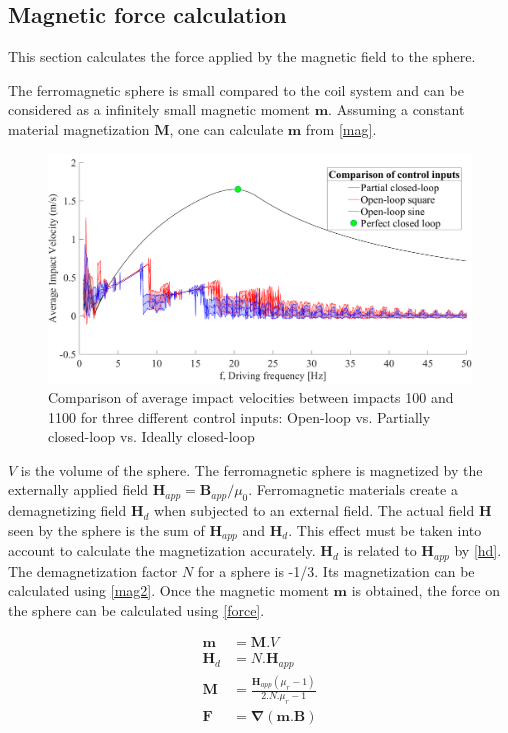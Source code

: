 \documentclass[letterpaper, 10 pt, conference]{ieeeconf}  %
\begin{document}
\subsection{Magnetic force calculation}
\label{magforce}

This section calculates the force applied by the magnetic field to the sphere.\par
The ferromagnetic sphere is small compared to the coil system and can be considered as a infinitely small magnetic moment $\mathbf{m}$. Assuming a constant material magnetization $\mathbf{M}$, one can calculate $\mathbf{m}$ from \cref{mag}.

\begin{figure}
	\includegraphics[width=\linewidth]{ComparisonOfControlInputs.pdf}
	\caption[Comparison of impact velocities from three control inputs]{Comparison of average impact velocities between impacts 100 and 1100 for three different control inputs: Open-loop vs. Partially closed-loop vs. Ideally closed-loop}
	\label{CLvsOL}
\end{figure}

 $V$ is the volume of the sphere.
The ferromagnetic sphere is magnetized by the externally applied field $\mathbf{H}_{app}=\mathbf{B}_{app}/\mu_0$. Ferromagnetic materials create a demagnetizing field $\mathbf{H}_d$ when subjected to an external field. The actual field $\mathbf{H}$ seen by the sphere is the sum of $\mathbf{H}_{app}$ and $\mathbf{H}_d$. This effect must be taken into account to calculate the magnetization accurately. $\mathbf{H}_d$ is related to $\mathbf{H}_{app}$ by \cref{hd}. The demagnetization factor $N$ for a sphere is -1/3. Its magnetization can be calculated using \cref{mag2}.
Once the magnetic moment $\mathbf{m}$ is obtained, the force on the sphere can be calculated using \cref{force}.

\begin{align}
\mathbf{m}&=\mathbf{M}.V \label{mag}\\
\mathbf{H}_d&=N.\mathbf{H}_{app}\label{hd}\\
\mathbf{M}&=\frac{\mathbf{H}_{app}\left ( \mu_r-1  \right )}{2.N.\mu_r-1} \label{mag2}\\
\mathbf{F}&=\mathbf{\nabla}(\mathbf{m}.\mathbf{B}) \label{force}
\end{align}
\end{document}
